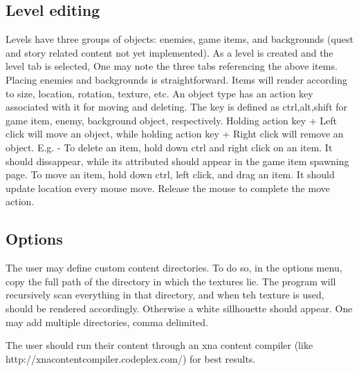 \documentclass[letterpaper]{article}
\begin{document}
\subsection{Level editing}
Levels have three groups of objects: enemies, game items, and backgrounds (quest and story related content not yet implemented). As a level is created and the level tab is selected, One may note the three tabs referencing the above items. Placing enemies and backgrounds is straightforward. Items will render according to size, location, rotation, texture, etc. 
An object type has an action key associated with it for moving and deleting. The key is defined as ctrl,alt,shift for game item, enemy, background object, respectively. Holding action key + Left click will move an object, while holding action key + Right click will remove an object.
E.g. - To delete an item, hold down ctrl and right click on an item. It should dissappear, while its attributed should appear in the game item spawning page.
To move an item, hold down ctrl, left click, and drag an item. It should update location every mouse move. Release the mouse to complete the move action.

\subsection{Options}
The user may define custom content directories. To do so, in the options menu, copy the full path of the directory in which the textures lie. The program will recursively scan everything in that directory, and when teh texture is used, should be rendered accordingly. Otherwise a white sillhouette should appear. One may add multiple directories, comma delimited.

The user should run their content through an xna content compiler (like http://xnacontentcompiler.codeplex.com/) for best results.
\end{document}
